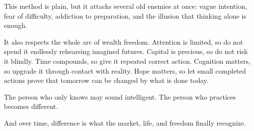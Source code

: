 This method is plain, but it attacks several old enemies at once: vague intention, fear of difficulty, addiction to preparation, and the illusion that thinking alone is enough.

It also respects the whole arc of wealth freedom. Attention is limited, so do not spend it endlessly rehearsing imagined futures. Capital is precious, so do not risk it blindly. Time compounds, so give it repeated correct action. Cognition matters, so upgrade it through contact with reality. Hope matters, so let small completed actions prove that tomorrow can be changed by what is done today.

The person who only knows may sound intelligent. The person who practices becomes different.

And over time, difference is what the market, life, and freedom finally recognize.
